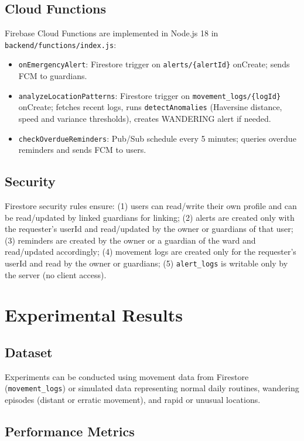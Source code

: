 \documentclass[conference]{IEEEtran}
\begin{document}
\subsection{Cloud Functions}

Firebase Cloud Functions are implemented in Node.js 18 in \texttt{backend/functions/index.js}:
\begin{itemize}
    \item \texttt{onEmergencyAlert}: Firestore trigger on \texttt{alerts/\{alertId\}} onCreate; sends FCM to guardians.
    \item \texttt{analyzeLocationPatterns}: Firestore trigger on \texttt{movement\_logs/\{logId\}} onCreate; fetches recent logs, runs \texttt{detectAnomalies} (Haversine distance, speed and variance thresholds), creates WANDERING alert if needed.
    \item \texttt{checkOverdueReminders}: Pub/Sub schedule every 5 minutes; queries overdue reminders and sends FCM to users.
\end{itemize}

\subsection{Security}

Firestore security rules ensure: (1) users can read/write their own profile and can be read/updated by linked guardians for linking; (2) alerts are created only with the requester's userId and read/updated by the owner or guardians of that user; (3) reminders are created by the owner or a guardian of the ward and read/updated accordingly; (4) movement logs are created only for the requester's userId and read by the owner or guardians; (5) \texttt{alert\_logs} is writable only by the server (no client access).

\section{Experimental Results}

\subsection{Dataset}

Experiments can be conducted using movement data from Firestore (\texttt{movement\_logs}) or simulated data representing normal daily routines, wandering episodes (distant or erratic movement), and rapid or unusual locations.

\subsection{Performance Metrics}
\end{document}
